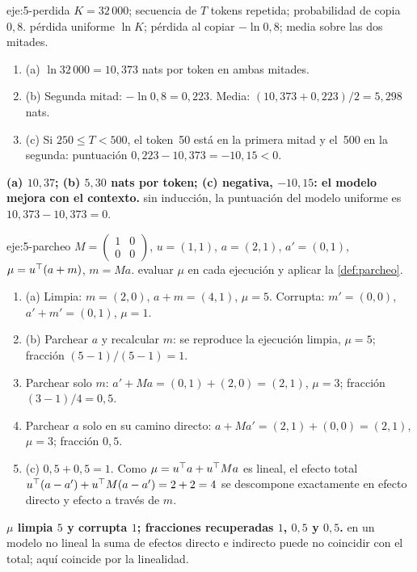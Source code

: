 \begin{solucion}{eje:5-perdida}
\datos $K=32\,000$; secuencia de $T$ tokens repetida; probabilidad de copia $0{,}8$.
\planteamiento pérdida uniforme $\ln K$; pérdida al copiar $-\ln 0{,}8$; media sobre las dos mitades.
\pasos
\begin{enumerate}[label=\arabic*.]
  \item (a) $\ln 32\,000=10{,}373$ nats por token en ambas mitades.
  \item (b) Segunda mitad: $-\ln 0{,}8=0{,}223$. Media: $(10{,}373+0{,}223)/2=5{,}298$ nats.
  \item (c) Si $250\le T<500$, el token~50 está en la primera mitad y el~500 en la segunda: puntuación $0{,}223-10{,}373=-10{,}15<0$.
\end{enumerate}
\resultado \textbf{(a) $10{,}37$; (b) $5{,}30$ nats por token; (c) negativa, $-10{,}15$: el modelo mejora con el contexto.}
\comprobacion sin inducción, la puntuación del modelo uniforme es $10{,}373-10{,}373=0$.
\end{solucion}

\begin{solucion}{eje:5-parcheo}
\datos $M=\begin{pmatrix}1&0\\0&0\end{pmatrix}$, $u=(1,1)$, $a=(2,1)$, $a'=(0,1)$, $\mu=u^{\top}(a+m)$, $m=Ma$.
\planteamiento evaluar $\mu$ en cada ejecución y aplicar la \cref{def:parcheo}.
\pasos
\begin{enumerate}[label=\arabic*.]
  \item (a) Limpia: $m=(2,0)$, $a+m=(4,1)$, $\mu=5$. Corrupta: $m'=(0,0)$, $a'+m'=(0,1)$, $\mu=1$.
  \item (b) Parchear $a$ y recalcular $m$: se reproduce la ejecución limpia, $\mu=5$; fracción $(5-1)/(5-1)=1$.
  \item Parchear solo $m$: $a'+Ma=(0,1)+(2,0)=(2,1)$, $\mu=3$; fracción $(3-1)/4=0{,}5$.
  \item Parchear $a$ solo en su camino directo: $a+Ma'=(2,1)+(0,0)=(2,1)$, $\mu=3$; fracción $0{,}5$.
  \item (c) $0{,}5+0{,}5=1$. Como $\mu=u^{\top} a+u^{\top} Ma$ es lineal, el efecto total $u^{\top}(a-a')+u^{\top} M(a-a')=2+2=4$ se descompone exactamente en efecto directo y efecto a través de $m$.
\end{enumerate}
\resultado \textbf{$\mu$ limpia $5$ y corrupta $1$; fracciones recuperadas $1$, $0{,}5$ y $0{,}5$.}
\comprobacion en un modelo no lineal la suma de efectos directo e indirecto puede no coincidir con el total; aquí coincide por la linealidad.
\end{solucion}

